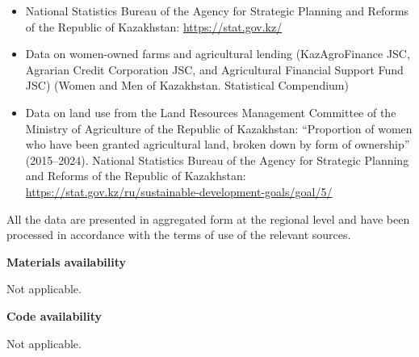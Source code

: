 ﻿\documentclass[pdflatex,sn-mathphys-ay]{sn-jnl}
\begin{document}
\begin{itemize}
\item National Statistics Bureau of the Agency for Strategic Planning
and Reforms of the Republic of Kazakhstan: \url{https://stat.gov.kz/}
\item Data on women-owned farms and agricultural lending
(KazAgroFinance JSC, Agrarian Credit Corporation JSC, and Agricultural
Financial Support Fund JSC) (Women and Men of Kazakhstan. Statistical
Compendium)
\item Data on land use from the Land Resources Management Committee of
the Ministry of Agriculture of the Republic of Kazakhstan: ``Proportion
of women who have been granted agricultural land, broken down by form of
ownership'' (2015--2024). National Statistics Bureau of the Agency for
Strategic Planning and Reforms of the Republic of Kazakhstan:
\url{https://stat.gov.kz/ru/sustainable-development-goals/goal/5/}
\end{itemize}

All the data are presented in aggregated form at the regional level and have
been processed in accordance with the terms of use of the relevant
sources.

\medskip
\noindent\textbf{Materials availability}

Not applicable.

\medskip
\noindent\textbf{Code availability}

Not applicable.


\end{document}
